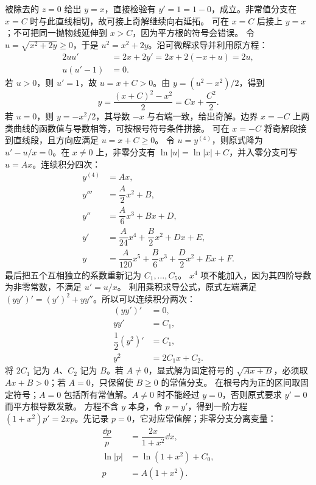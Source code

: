 被除去的 $z=0$ 给出 $y=x$，直接检验有 $y'=1=1-0$，成立。非常值分支在 $x=C$ 时与此直线相切，故可接上奇解继续向右延拓。
可在 $x=C$ 后接上 $y=x$；不可把同一抛物线延伸到 $x>C$，因为平方根的符号会错误。
令 $u=\sqrt{x^2+2y}\ge0$，于是 $u^2=x^2+2y$。沿可微解求导并利用原方程：
\[
\begin{aligned}
2uu'&=2x+2y'=2x+2(-x+u)=2u,\\
u(u'-1)&=0.
\end{aligned}
\]
若 $u>0$，则 $u'=1$，故 $u=x+C>0$。由 $y=(u^2-x^2)/2$，得到
\[
y=\dfrac{(x+C)^2-x^2}{2}=Cx+\dfrac{C^2}{2}.
\]
若 $u=0$，则 $y=-x^2/2$，其导数 $-x$ 与右端一致，给出奇解。边界 $x=-C$ 上两类曲线的函数值与导数相等，可按根号符号条件拼接。
可在 $x=-C$ 将奇解段接到直线段，且方向应满足 $u=x+C\ge0$。
令 $u=y^{(4)}$，则原式降为 $u'-u/x=0$。在 $x\ne0$ 上，非零分支有 $\ln|u|=\ln|x|+C$，并入零分支可写 $u=Ax$。连续积分四次：
\[
\begin{aligned}
y^{(4)}&=Ax,\\
y'''&=\dfrac A2x^2+B,\\
y''&=\dfrac A6x^3+Bx+D,\\
y'&=\dfrac A{24}x^4+\dfrac B2x^2+Dx+E,\\
y&=\dfrac A{120}x^5+\dfrac B6x^3+\dfrac D2x^2+Ex+F.
\end{aligned}
\]
最后把五个互相独立的系数重新记为 $C_1,\ldots,C_5$。
$x^4$ 项不能加入，因为其四阶导数为非零常数，不满足 $u'=u/x$。
利用乘积求导公式，原式左端满足 $(yy')'=(y')^2+yy''$。所以可以连续积分两次：
\[
\begin{aligned}
(yy')'&=0,\\
yy'&=C_1,\\
\dfrac12(y^2)'&=C_1,\\
y^2&=2C_1x+C_2.
\end{aligned}
\]
将 $2C_1$ 记为 $A$、$C_2$ 记为 $B$。若 $A\ne0$，显式解为固定符号的 $\sqrt{Ax+B}$，必须取 $Ax+B>0$；若 $A=0$，只保留使 $B\ge0$ 的常值分支。
在根号内为正的区间取固定符号；$A=0$ 包括所有常值解。$A\ne0$ 时不能经过 $y=0$，否则原式要求 $y'=0$ 而平方根导数发散。
方程不含 $y$ 本身，令 $p=y'$，得到一阶方程 $(1+x^2)p'=2xp$。先记录 $p=0$，它对应常值解；非零分支分离变量：
\[
\begin{aligned}
\dfrac{\dd p}p&=\dfrac{2x}{1+x^2}\dd x,\\
\ln|p|&=\ln(1+x^2)+C_0,\\
p&=A(1+x^2).
\end{aligned}
\]
